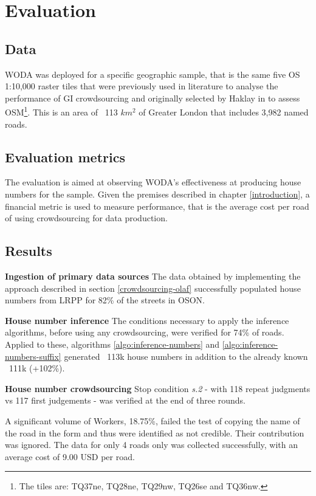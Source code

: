 \section{Evaluation}

\subsection{Data}

WODA was deployed for a specific geographic sample, that is the same five OS 1:10,000 raster tiles that were previously used in literature to analyse the performance of GI crowdsourcing and originally selected by Haklay in \cite{Haklay:2010vs} to assess OSM\footnote{The tiles are: TQ37ne, TQ28ne, TQ29nw, TQ26se and TQ36nw.}. This is an area of ~113 $ km^2 $ of Greater London that includes 3,982 named roads. 

\subsection{Evaluation metrics}

The evaluation is aimed at observing WODA's effectiveness at producing house numbers for the sample. Given the premises described in chapter \ref{introduction}, a financial metric is used to measure performance, that is the average cost per road of using crowdsourcing for data production. 

\subsection{Results}

\textbf{Ingestion of primary data sources} The data obtained by implementing the approach described in section \ref{crowdsourcing-olaf} successfully populated house numbers from LRPP for 82\% of the streets in OSON.

\textbf{House number inference} The conditions necessary to apply the inference algorithms, before using any crowdsourcing, were verified for 74\% of roads. Applied to these, algorithms \ref{algo:inference-numbers} and \ref{algo:inference-numbers-suffix} generated ~113k house numbers in addition to the already known ~111k (+102\%). 

\textbf{House number crowdsourcing} Stop condition {\it s.2} - with 118 repeat judgments vs 117 first judgements - was verified at the end of three rounds. 

A significant volume of Workers, 18.75\%, failed the test of copying the name of the road in the form and thus were identified as not credible. Their contribution was ignored. The data for only 4 roads only was collected successfully, with an average cost of 9.00 USD per road.

